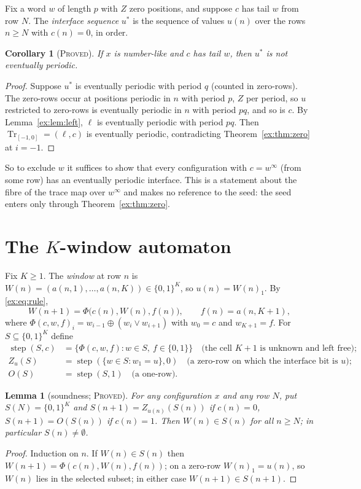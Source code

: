 \documentclass[11pt]{article}
\newtheorem{lemma}[theorem]{Lemma}
\newtheorem{corollary}[theorem]{Corollary}
\theoremstyle{definition}
\theoremstyle{remark}
\newcommand{\Tr}{\operatorname{Tr}}
\newcommand{\step}{\operatorname{step}}
\newcommand{\PROVED}{\textsc{Proved}}
\begin{document}
Fix a word $w$ of length $p$ with $Z$ zero positions, and suppose $c$ has tail $w$ from row $N$. The \emph{interface sequence} $u^*$ is the sequence of values $u(n)$ over the rows $n\ge N$ with $c(n)=0$, in order.

\begin{corollary}[\PROVED]\label{ex:cor:interface}
If $x$ is number-like and $c$ has tail $w$, then $u^*$ is not eventually periodic.
\end{corollary}
\begin{proof}
Suppose $u^*$ is eventually periodic with period $q$ (counted in zero-rows). The zero-rows occur at positions periodic in $n$ with period $p$, $Z$ per period, so $u$ restricted to zero-rows is eventually periodic in $n$ with period $pq$, and so is $c$. By Lemma~\ref{ex:lem:left}, $\ell$ is eventually periodic with period $pq$. Then $\Tr_{[-1,0]}=(\ell,c)$ is eventually periodic, contradicting Theorem~\ref{ex:thm:zero} at $i=-1$.
\end{proof}

So to exclude $w$ it suffices to show that every configuration with $c=w^\infty$ (from some row) has an eventually periodic interface. This is a statement about the fibre of the trace map over $w^\infty$ and makes no reference to the seed: the seed enters only through Theorem~\ref{ex:thm:zero}.

\section{The $K$-window automaton}\label{ex:sec:window}

Fix $K\ge1$. The \emph{window} at row $n$ is $W(n)=(a(n,1),\dots,a(n,K))\in\{0,1\}^K$, so $u(n)=W(n)_1$. By \eqref{ex:eq:rule},
\[
W(n+1)=\Phi\bigl(c(n),W(n),f(n)\bigr),\qquad f(n)=a(n,K+1),
\]
where $\Phi(c,w,f)_i=w_{i-1}\oplus(w_i\vee w_{i+1})$ with $w_0=c$ and $w_{K+1}=f$. For $S\subseteq\{0,1\}^K$ define
\begin{align*}
\step(S,c)&=\{\Phi(c,w,f):w\in S,\ f\in\{0,1\}\}\quad\text{(the cell $K+1$ is unknown and left free);}\\
Z_u(S)&=\step(\{w\in S:w_1=u\},0)\quad\text{(a zero-row on which the interface bit is $u$);}\\
O(S)&=\step(S,1)\quad\text{(a one-row).}
\end{align*}

\begin{lemma}[soundness; \PROVED]\label{ex:lem:sound}
For any configuration $x$ and any row $N$, put $S(N)=\{0,1\}^K$ and $S(n+1)=Z_{u(n)}(S(n))$ if $c(n)=0$, $S(n+1)=O(S(n))$ if $c(n)=1$. Then $W(n)\in S(n)$ for all $n\ge N$; in particular $S(n)\ne\emptyset$.
\end{lemma}
\begin{proof}
Induction on $n$. If $W(n)\in S(n)$ then $W(n+1)=\Phi(c(n),W(n),f(n))$; on a zero-row $W(n)_1=u(n)$, so $W(n)$ lies in the selected subset; in either case $W(n+1)\in S(n+1)$.
\end{proof}
\end{document}
